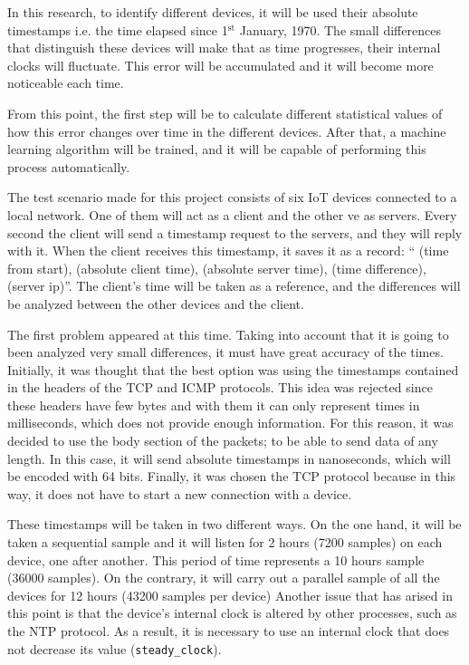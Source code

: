 In this research, to identify different devices, it will be used their absolute timestamps i.e. the time elapsed since 1$^\text{st}$ January, 1970. The small differences that distinguish these devices will make that as time progresses, their internal clocks will fluctuate. This error will be accumulated and it will become more noticeable each time.


From this point, the first step will be to calculate different statistical values of how this error changes over time in the different devices. After that, a machine learning algorithm will be trained, and it will be capable of performing this process automatically.


The test scenario made for this project consists of six IoT devices connected to a local network. One of them will act as a client and the other ve as servers. Every second the client will send a timestamp request to the servers, and they will reply with it. When the client receives this timestamp, it saves it as a record: “ (time from start), (absolute client time), (absolute server time), (time difference), (server ip)”. The client's time will be taken as a reference, and the differences will be analyzed between the other devices and the client.


The first problem appeared at this time. Taking into account that it is going to been analyzed very small differences, it must have great accuracy of the times. Initially, it was thought that the best option was using the timestamps contained in the headers of the TCP and ICMP protocols. This idea was rejected since these headers have few bytes and with them it can only represent times in milliseconds, which does not provide enough information. For this reason, it was decided to use the body section of the packets; to be able to send data of any length. In this case, it will send absolute timestamps in nanoseconds, which will be encoded with 64 bits. Finally, it was chosen the TCP protocol because in this way, it does not have to start a new connection with a device. 


These timestamps will be taken in two different ways. On the one hand, it will be taken a sequential sample and it will listen for 2 hours (7200 samples) on each device, one after another. This period of time represents a 10 hours sample (36000 samples). On the contrary, it will carry out a parallel sample of all the devices for 12 hours (43200 samples per device) Another issue that has arised in this point is that the device's internal clock is altered by other processes, such as the NTP protocol. As a result, it is necessary to use an internal clock that does not decrease its value (\texttt{steady\_clock}). 


